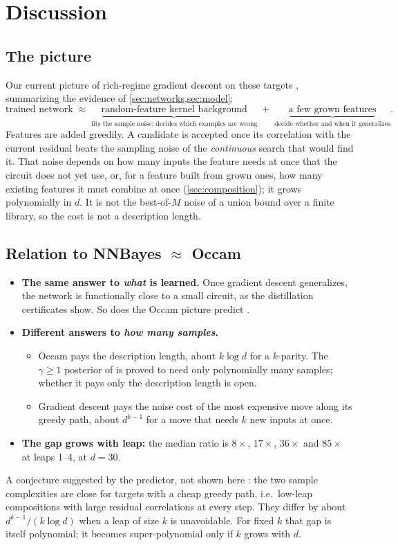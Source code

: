 \section{Discussion}\label{sec:discussion}

\subsection{The picture}

Our current picture of rich-regime gradient descent on these targets , summarizing the evidence of \cref{sec:networks,sec:model}:
\[
\text{trained network}\;\approx\;\underbrace{\text{random-feature kernel background}}_{\text{fits the sample noise; decides which examples are wrong}}\;+\;\underbrace{\text{a few grown features}}_{\text{decide whether and when it generalizes}}.
\]
Features are added greedily. A candidate is accepted once its correlation with the current residual beats the sampling noise of the \emph{continuous} search that would find it. That noise depends on how many inputs the feature needs at once that the circuit does not yet use, or, for a feature built from grown ones, how many existing features it must combine at once (\cref{sec:composition}); it grows polynomially in $d$. It is not the best-of-$M$ noise of a union bound over a finite library, so the cost is not a description length.

\subsection{Relation to NNBayes $\approx$ Occam}

\begin{itemize}
\item \textbf{The same answer to \emph{what} is learned.} Once gradient descent generalizes, the network is functionally close to a small circuit, as the distillation certificates show. So does the Occam picture predict \cite{nngen}.
\item \textbf{Different answers to \emph{how many samples}.}
  \begin{itemize}
  \item Occam pays the description length, about $k\log d$ for a $k$-parity. The $\gamma\ge1$ posterior of \cite{nngen} is proved to need only polynomially many samples; whether it pays only the description length is open.
  \item Gradient descent pays the noise cost of the most expensive move along its greedy path, about $d^{k-1}$ for a move that needs $k$ new inputs at once.
  \end{itemize}
\item \textbf{The gap grows with leap:} the median ratio is $8\times$, $17\times$, $36\times$ and $85\times$ at leaps 1–4, at $d=30$.
\end{itemize}
A conjecture suggested by the predictor, not shown here : the two sample complexities are close for targets with a cheap greedy path, i.e.\ low-leap compositions with large residual correlations at every step. They differ by about $d^{k-1}/(k\log d)$ when a leap of size $k$ is unavoidable. For fixed $k$ that gap is itself polynomial; it becomes super-polynomial only if $k$ grows with $d$.

